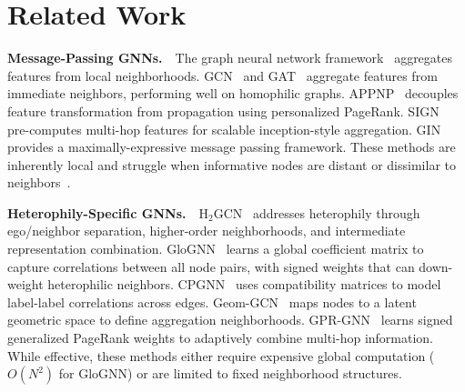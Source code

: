 \documentclass[manuscript, screen, review, anonymous]{acmart}
\begin{document}
\section{Related Work}
\label{sec:related}

\textbf{Message-Passing GNNs.}~~The graph neural network framework~\cite{scarselli2009gnn, gilmer2017mpnn} aggregates features from local neighborhoods. GCN~\cite{kipf2017semi} and GAT~\cite{velickovic2018gat} aggregate features from immediate neighbors, performing well on homophilic graphs. APPNP~\cite{klicpera2019appnp} decouples feature transformation from propagation using personalized PageRank. SIGN~\cite{rossi2020sign} pre-computes multi-hop features for scalable inception-style aggregation. GIN~\cite{xu2019powerful} provides a maximally-expressive message passing framework. These methods are inherently local and struggle when informative nodes are distant or dissimilar to neighbors~\cite{li2018oversmoothing}.

\textbf{Heterophily-Specific GNNs.}~~H$_2$GCN~\cite{zhu2020h2gcn} addresses heterophily through ego/neighbor separation, higher-order neighborhoods, and intermediate representation combination. GloGNN~\cite{li2022glognn} learns a global coefficient matrix to capture correlations between all node pairs, with signed weights that can down-weight heterophilic neighbors. CPGNN~\cite{zhu2021cpgnn} uses compatibility matrices to model label-label correlations across edges. Geom-GCN~\cite{pei2020geomgcn} maps nodes to a latent geometric space to define aggregation neighborhoods. GPR-GNN~\cite{chien2021gprgnn} learns signed generalized PageRank weights to adaptively combine multi-hop information. While effective, these methods either require expensive global computation ($O(N^2)$ for GloGNN) or are limited to fixed neighborhood structures.
\end{document}
